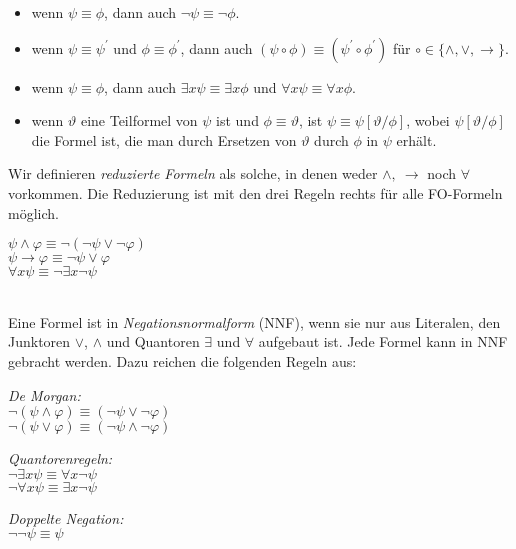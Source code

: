 \documentclass{panikzettel}
\begin{document}
\begin{itemize}
	\item wenn $\psi \equiv \phi$, dann auch $\lnot \psi \equiv \lnot \phi$.
	\item wenn $\psi \equiv \psi^\prime$ und $\phi \equiv \phi^\prime$, dann auch $(\psi \circ \phi) \equiv (\psi^\prime \circ \phi^\prime)$ für $\circ\in\{\land,\lor,\to\}$.
	\item wenn $\psi \equiv \phi$, dann auch $\exists x \psi \equiv \exists x \phi$ und $\forall x \psi \equiv \forall x \phi$.
	\item wenn $\vartheta$ eine Teilformel von $\psi$ ist und $\phi \equiv \vartheta$, ist $\psi \equiv \psi[\vartheta/\phi]$, wobei $\psi[\vartheta/\phi]$ die Formel ist, die man durch Ersetzen von $\vartheta$ durch $\phi$ in $\psi$ erhält.
\end{itemize}

\begin{minipage}{0.55\textwidth}
Wir definieren \emph{reduzierte Formeln} als solche, in denen weder $\land,\ \rightarrow$ noch $\forall$ vorkommen. Die Reduzierung ist mit den drei Regeln rechts für alle FO-Formeln möglich.
\end{minipage}
\begin{minipage}{0.4\textwidth}
\centering
$\psi \land \varphi \equiv \neg (\neg \psi \lor \neg \varphi)$ \\
$\psi \rightarrow \varphi \equiv \neg \psi \lor \varphi$ \\
$\forall x \psi \equiv \neg \exists x \neg \psi$
\end{minipage}
\ \\

Eine Formel ist in \emph{Negationsnormalform} (NNF), wenn sie nur aus Literalen, den Junktoren $\lor$, $\land$ und Quantoren $\exists$ und $\forall$ aufgebaut ist. Jede Formel kann in NNF gebracht werden. Dazu reichen die folgenden Regeln aus:

\begin{minipage}[t]{0.33\textwidth}
\centering
\emph{De Morgan:}   \\
$\neg (\psi \land \varphi) \equiv (\neg \psi \lor \neg \varphi)$    \\
$\neg (\psi \lor \varphi) \equiv (\neg \psi \land \neg \varphi)$
\end{minipage}
\begin{minipage}[t]{0.33\textwidth}
\centering
\emph{Quantorenregeln:} \\
$\neg \exists x \psi \equiv \forall x \neg \psi$    \\
$\neg \forall x \psi \equiv \exists x \neg \psi$
\end{minipage}
\begin{minipage}[t]{0.33\textwidth}
\centering
\emph{Doppelte Negation:}   \\
$\neg \neg \psi \equiv \psi$
\end{minipage}
\medskip
\end{document}
